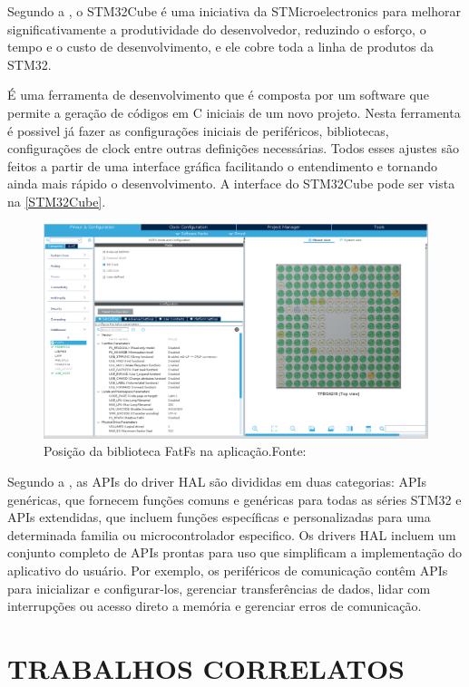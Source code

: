 Segundo a , o STM32Cube é uma iniciativa da STMicroelectronics para melhorar significativamente a produtividade do desenvolvedor, reduzindo o esforço, o tempo e o custo de desenvolvimento, e ele cobre toda a linha de produtos da STM32.

É uma ferramenta de desenvolvimento que é composta por um software que permite a geração de códigos em C iniciais de um novo projeto. Nesta ferramenta é possivel já fazer as configurações iniciais de periféricos, bibliotecas, configurações de clock entre outras definições necessárias. Todos esses ajustes são feitos a partir de uma interface gráfica facilitando o entendimento e tornando ainda mais rápido o desenvolvimento. A interface do STM32Cube pode ser vista na \autoref{STM32Cube}.
\begin{figure}[H]
    \scriptsize
     \centering
     \includegraphics[scale=0.43]{dados/figuras/stm32cube.png}
     \caption{Posição da biblioteca FatFs na aplicação.\newline  Fonte:\cite{FATFS}}
     \label{STM32Cube}
\end{figure}

Segundo a , as APIs do driver HAL são divididas em duas categorias: APIs genéricas, que fornecem funções comuns e genéricas para todas as séries STM32 e APIs extendidas, que incluem funções específicas e personalizadas para uma determinada familia ou microcontrolador especifico. Os drivers HAL incluem um conjunto completo de APIs prontas para uso que simplificam a implementação do aplicativo do usuário. Por exemplo, os periféricos de comunicação contêm APIs para inicializar e configurar-los, gerenciar transferências de dados, lidar com interrupções ou acesso direto a memória e gerenciar erros de comunicação.

\section{TRABALHOS CORRELATOS}

